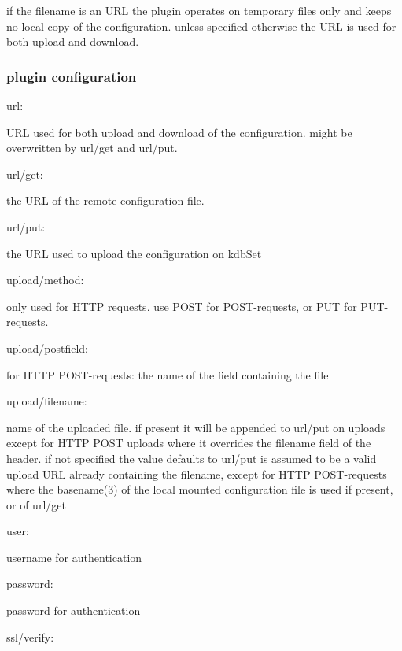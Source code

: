 if the filename is an {\ttfamily U\+RL} the plugin operates on temporary files only and keeps no local copy of the configuration. unless specified otherwise the {\ttfamily U\+RL} is used for both upload and download.

\subsubsection*{plugin configuration}


\begin{DoxyItemize}
\item {\ttfamily url}\+:

{\ttfamily U\+RL} used for both upload and download of the configuration. might be overwritten by {\ttfamily url/get} and {\ttfamily url/put}.
\item {\ttfamily url/get}\+:

the {\ttfamily U\+RL} of the remote configuration file.
\item {\ttfamily url/put}\+:

the {\ttfamily U\+RL} used to upload the configuration on kdb\+Set
\item {\ttfamily upload/method}\+:

only used for {\ttfamily H\+T\+TP} requests. use {\ttfamily P\+O\+ST} for {\ttfamily P\+O\+ST}-\/requests, or {\ttfamily P\+UT} for {\ttfamily P\+UT}-\/requests.
\item {\ttfamily upload/postfield}\+:

for {\ttfamily H\+T\+TP P\+O\+ST}-\/requests\+: the name of the field containing the file
\item {\ttfamily upload/filename}\+:

name of the uploaded file. if present it will be appended to {\ttfamily url/put} on uploads except for {\ttfamily H\+T\+TP P\+O\+ST} uploads where it overrides the {\ttfamily filename} field of the header. if not specified the value defaults to {\ttfamily url/put} is assumed to be a valid upload {\ttfamily U\+RL} already containing the filename, except for {\ttfamily H\+T\+TP P\+O\+ST}-\/requests where the {\ttfamily basename(3)} of the local mounted configuration file is used if present, or of {\ttfamily url/get}
\item {\ttfamily user}\+:

username for authentication
\item {\ttfamily password}\+:

password for authentication
\item {\ttfamily ssl/verify}\+:


\end{DoxyItemize}
